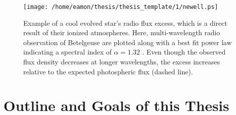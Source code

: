 \begin{figure}[hbt!]\label{fig:1.5.4}
\centering 
          \texttt{[image: /home/eamon/thesis/thesis\_template/1/newell.ps]}
\caption[]{Example of a cool evolved star's radio flux excess, which is a direct result of their ionized atmospheres. Here, multi-wavelength radio observation of Betelgeuse are plotted along with a best fit power law indicating a spectral index of $\alpha = 1.32$ \citep{newell_1982}.  Even though the observed flux density decreases at longer wavelengths, the excess increases relative to the expected photospheric flux (dashed line).}
\label{fig:1.5.5}
\end{figure}
\section{Outline and Goals of this Thesis}
